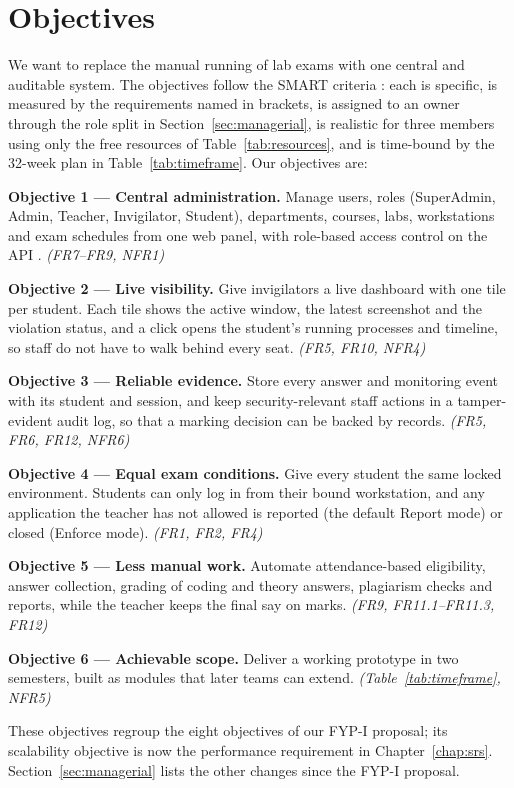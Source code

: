 \section{Objectives}

We want to replace the manual running of lab exams with one central and auditable system. The objectives follow the SMART criteria \cite{doran1981}: each is specific, is measured by the requirements named in brackets, is assigned to an owner through the role split in Section~\ref{sec:managerial}, is realistic for three members using only the free resources of Table~\ref{tab:resources}, and is time-bound by the 32-week plan in Table~\ref{tab:timeframe}. Our objectives are:

\textbf{Objective 1 --- Central administration.} Manage users, roles (SuperAdmin, Admin, Teacher, Invigilator, Student), departments, courses, labs, workstations and exam schedules from one web panel, with role-based access control on the API \cite{rbac1}. \textit{(FR7--FR9, NFR1)}

\textbf{Objective 2 --- Live visibility.} Give invigilators a live dashboard with one tile per student. Each tile shows the active window, the latest screenshot and the violation status, and a click opens the student's running processes and timeline, so staff do not have to walk behind every seat. \textit{(FR5, FR10, NFR4)}

\textbf{Objective 3 --- Reliable evidence.} Store every answer and monitoring event with its student and session, and keep security-relevant staff actions in a tamper-evident audit log, so that a marking decision can be backed by records. \textit{(FR5, FR6, FR12, NFR6)}

\textbf{Objective 4 --- Equal exam conditions.} Give every student the same locked environment. Students can only log in from their bound workstation, and any application the teacher has not allowed is reported (the default Report mode) or closed (Enforce mode). \textit{(FR1, FR2, FR4)}

\textbf{Objective 5 --- Less manual work.} Automate attendance-based eligibility, answer collection, grading of coding and theory answers, plagiarism checks and reports, while the teacher keeps the final say on marks. \textit{(FR9, FR11.1--FR11.3, FR12)}

\textbf{Objective 6 --- Achievable scope.} Deliver a working prototype in two semesters, built as modules that later teams can extend. \textit{(Table~\ref{tab:timeframe}, NFR5)}

These objectives regroup the eight objectives of our FYP-I proposal; its scalability objective is now the performance requirement in Chapter~\ref{chap:srs}. Section~\ref{sec:managerial} lists the other changes since the FYP-I proposal.
